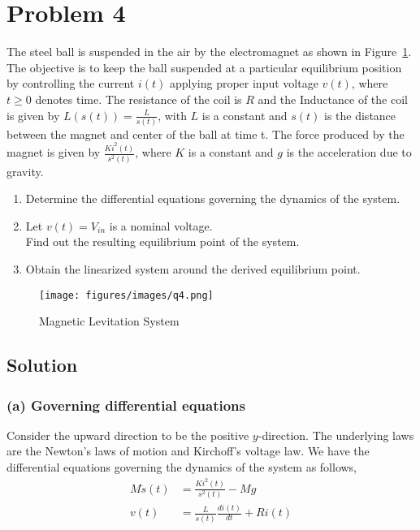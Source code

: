 \section*{Problem 4}

The steel ball is suspended in the air by the electromagnet as shown in Figure~\ref{fig:q4}.
The objective is to keep the ball suspended at a particular equilibrium position by controlling the current \(i(t)\) applying proper input voltage \(v(t)\), where \(t \geq 0\) denotes time.
The resistance of the coil is \(R\) and the Inductance of the coil is given by \(L(s(t)) = \frac{L}{s(t)}\), with \(L\) is a constant and \(s(t)\) is the distance between the magnet and center of the ball at time t.
The force produced by the magnet is given by \(\frac{K i^2(t)}{s^2(t)}\), where \(K\) is a constant and \(g\) is the acceleration due to gravity.

\begin{enumerate}[label= (\alph*)]
    \item Determine the differential equations governing the dynamics of the system.
    \item Let \(v(t) = V_{in}\) is a nominal voltage. \\
          Find out the resulting equilibrium point of the system.
    \item Obtain the linearized system around the derived equilibrium point.
\end{enumerate}

\begin{figure}[h]
    \centering
    \texttt{[image: figures/images/q4.png]}
    \caption{
        Magnetic Levitation System
    }\label{fig:q4}
\end{figure}

\clearpage
\subsection*{Solution}

\subsubsection*{(a) Governing differential equations}

Consider the upward direction to be the positive \(y\)-direction.
The underlying laws are the Newton's laws of motion and Kirchoff's voltage law.
We have the differential equations governing the dynamics of the system as follows,
\begin{align*}
    M \ddot s(t) & = \frac{Ki^2(t)}{s^2(t)} - Mg             \\
    v(t)         & = \frac{L}{s(t)}\frac{di(t)}{dt} + R i(t)
\end{align*}

